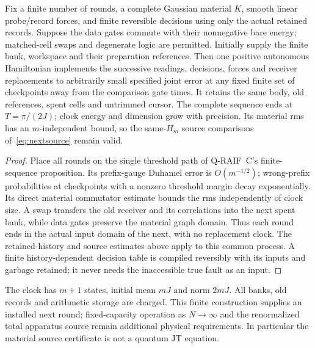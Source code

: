 \begin{corollary}
\label{cor:installed-returns}
Fix a finite number of rounds, a complete Gaussian material $K$,
smooth linear probe/record forces, and finite reversible decisions
using only the actual retained records. Suppose the data gates
commute with their nonnegative bare energy; matched-cell swaps and
degenerate logic are permitted. Initially supply the finite bank,
workspace and their preparation references.
Then one positive autonomous Hamiltonian implements the successive
readings, decisions, forces and receiver replacements to arbitrarily
small specified joint error at any fixed finite set of checkpoints
away from the comparison gate times. It retains the same body,
old references, spent cells and untrimmed cursor. The complete
sequence ends at $T=\pi/(2J)$; clock energy and dimension grow with
precision. Its material rms has an $m$-independent bound, so the
same-$H_m$ source comparisons of~\eqref{eq:nextsource} remain valid.
\end{corollary}
\begin{proof}
Place all rounds on the single threshold path of Q-RAIF~C's
finite-sequence proposition. Its prefix-gauge Duhamel error is
$O(m^{-1/2})$; wrong-prefix probabilities at checkpoints with a
nonzero threshold margin decay exponentially. Its direct material
commutator estimate bounds the rms independently of clock size.
A swap transfers the old receiver and its correlations into the
next spent bank, while data gates preserve the material graph domain.
Thus each round ends in the actual input domain of the next, with
no replacement clock. The retained-history and source estimates
above apply to this common process. A finite history-dependent
decision table is compiled reversibly with its inputs and garbage
retained; it never needs the inaccessible true fault as an input.
\end{proof}

The clock has $m+1$ states, initial mean $mJ$ and norm $2mJ$.
All banks, old records and arithmetic storage are charged. This
finite construction supplies an installed next round; fixed-capacity
operation as $N\to\infty$ and the renormalized total apparatus source
remain additional physical requirements. In particular the material
source certificate is not a quantum JT equation.
